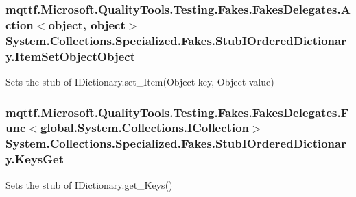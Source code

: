 \hypertarget{class_system_1_1_collections_1_1_specialized_1_1_fakes_1_1_stub_i_ordered_dictionary_add4f4ad8fac3d13ad4d5309753632091}{
\subsubsection[{Item\-Set\-Object\-Object}]{\setlength{\rightskip}{0pt plus 5cm}mqttf.\-Microsoft.\-Quality\-Tools.\-Testing.\-Fakes.\-Fakes\-Delegates.\-Action$<$object, object$>$ System.\-Collections.\-Specialized.\-Fakes.\-Stub\-I\-Ordered\-Dictionary.\-Item\-Set\-Object\-Object}}\label{class_system_1_1_collections_1_1_specialized_1_1_fakes_1_1_stub_i_ordered_dictionary_add4f4ad8fac3d13ad4d5309753632091}


Sets the stub of I\-Dictionary.\-set\-\_\-\-Item(\-Object key, Object value)

\hypertarget{class_system_1_1_collections_1_1_specialized_1_1_fakes_1_1_stub_i_ordered_dictionary_a83e9f59a5fb1ae3f714c86ae52e5bbb1}{
\subsubsection[{Keys\-Get}]{\setlength{\rightskip}{0pt plus 5cm}mqttf.\-Microsoft.\-Quality\-Tools.\-Testing.\-Fakes.\-Fakes\-Delegates.\-Func$<$global.\-System.\-Collections.\-I\-Collection$>$ System.\-Collections.\-Specialized.\-Fakes.\-Stub\-I\-Ordered\-Dictionary.\-Keys\-Get}}\label{class_system_1_1_collections_1_1_specialized_1_1_fakes_1_1_stub_i_ordered_dictionary_a83e9f59a5fb1ae3f714c86ae52e5bbb1}


Sets the stub of I\-Dictionary.\-get\-\_\-\-Keys()

